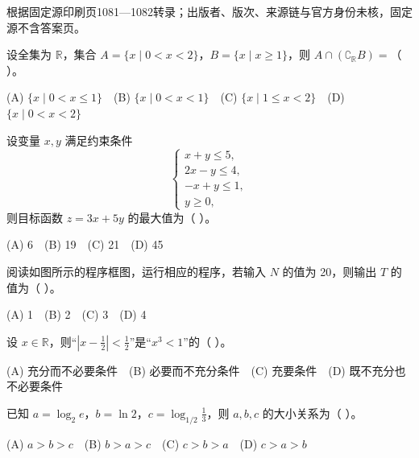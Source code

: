 


\begin{gktip}
根据固定源印刷页1081—1082转录；出版者、版次、来源链与官方身份未核，固定源不含答案页。
\end{gktip}


\begin{question}
设全集为 $\mathbb R$，集合 $A=\{x\mid 0<x<2\}$，$B=\{x\mid x\geqslant1\}$，则 $A\cap(\complement_{\mathbb R}B)=$（ ）。

(A) $\{x\mid 0<x\leqslant1\}$　(B) $\{x\mid 0<x<1\}$　(C) $\{x\mid 1\leqslant x<2\}$　(D) $\{x\mid 0<x<2\}$

\end{question}
\begin{question}
设变量 $x,y$ 满足约束条件
\nopagebreak[4]
\[
\begin{cases}
x+y\leqslant5,\\
2x-y\leqslant4,\\
-x+y\leqslant1,\\
y\geqslant0,
\end{cases}
\]
则目标函数 $z=3x+5y$ 的最大值为（ ）。

(A) 6　(B) 19　(C) 21　(D) 45

\Needspace{0.4\textheight}
\end{question}
\begin{question}
阅读如图所示的程序框图，运行相应的程序，若输入 $N$ 的值为 20，则输出 $T$ 的值为（ ）。
\nopagebreak[4]
\begin{center}\end{center}
\nopagebreak[4]
(A) 1　(B) 2　(C) 3　(D) 4

\end{question}
\begin{question}
设 $x\in\mathbb R$，则“$\left|x-\frac12\right|<\frac12$”是“$x^3<1$”的（ ）。

(A) 充分而不必要条件　(B) 必要而不充分条件　(C) 充要条件　(D) 既不充分也不必要条件

\end{question}
\begin{question}
已知 $a=\log_2 e$，$b=\ln2$，$c=\log_{1/2}\frac13$，则 $a,b,c$ 的大小关系为（ ）。

(A) $a>b>c$　(B) $b>a>c$　(C) $c>b>a$　(D) $c>a>b$

\end{question}
